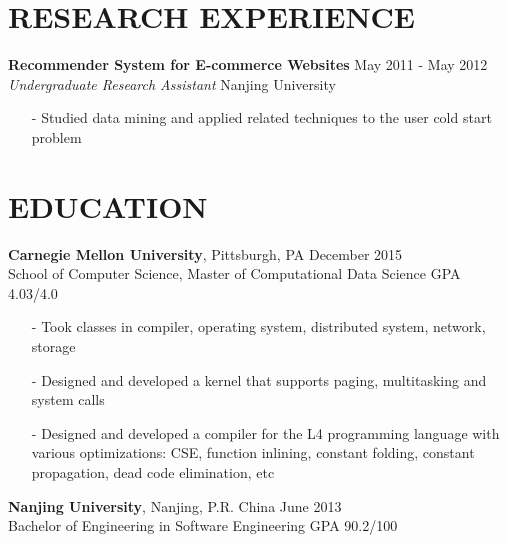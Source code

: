 \documentclass[mm, 7pt]{resume} %
\begin{document}
\begin{resume}
 
\section{RESEARCH EXPERIENCE}

\textbf{Recommender System for E-commerce Websites}       \hfill  May 2011 - May 2012 \\
{\sl Undergraduate Research Assistant}  \hfill  Nanjing University
\begin{itemize} \itemsep -2pt
\item[-] Studied data mining and applied related techniques to the user cold start problem
\end{itemize}

 
\section{EDUCATION}

\textbf{Carnegie Mellon University}, Pittsburgh, PA \hfill December 2015 \\
School of Computer Science, Master of Computational Data Science \hfill GPA 4.03/4.0
\begin{itemize} \itemsep -2pt
\item[-] Took classes in compiler, operating system, distributed system, network, storage
\item[-] Designed and developed a kernel that supports paging, multitasking and system calls
\item[-] Designed and developed a compiler for the L4 programming language with various optimizations: CSE, function inlining, constant folding, constant propagation, dead code elimination, etc
\end{itemize}

\textbf{Nanjing University}, Nanjing, P.R. China \hfill June 2013 \\
Bachelor of Engineering in Software Engineering \hfill GPA 90.2/100


\end{resume}
\end{document}
